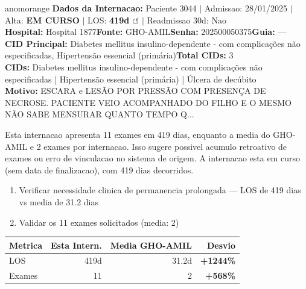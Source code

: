 \documentclass[a4paper,10pt]{article}
\begin{document}
\begin{anomalycard}[Internacao 2946 | GHO-AMIL | ALTO (z=3.63)]{anomorange}
\textbf{Dados da Internacao:} Paciente 3044 $\mid$ Admissao: 28/01/2025 $\mid$ Alta: \textcolor{anomorange}{\textbf{EM CURSO}} $\mid$ LOS: \textbf{419d \textcolor{anomorange}{$\circlearrowleft$}} $\mid$ Readmissao 30d: Nao\\
\textbf{Hospital:} Hospital 1877\quad\textbf{Fonte:} GHO-AMIL\quad\textbf{Senha:} 202500050375\quad\textbf{Guia:} ---\\
\textbf{CID Principal:} {\small Diabetes mellitus insulino-dependente - com complicações não especificadas, Hipertensão essencial (primária)}\quad\textbf{Total CIDs:} 3\\

\textbf{CIDs:} {\scriptsize Diabetes mellitus insulino-dependente - com complicações não especificadas | Hipertensão essencial (primária) | Úlcera de decúbito}\\

\textbf{Motivo:} {\scriptsize ESCARA e LESÃO POR PRESSÃO COM PRESENÇA DE NECROSE.  PACIENTE VEIO ACOMPANHADO DO FILHO E O MESMO NÃO SABE MENSURAR QUANTO TEMPO Q...}\\

\vspace{2pt}\begin{tcolorbox}[colback=severityred!20,colframe=anomorange,title={\textbf{Interpretacao de Negocio}},fonttitle=\bfseries\small,left=4pt,right=4pt,top=3pt,bottom=3pt]
{\small Esta internacao apresenta 11 exames em 419 dias, enquanto a media do GHO-AMIL e 2 exames por internacao. Isso sugere possivel acumulo retroativo de exames ou erro de vinculacao no sistema de origem. A internacao esta em curso (sem data de finalizacao), com 419 dias decorridos.}
\end{tcolorbox}
\begin{tcolorbox}[colback=severityyellow!30,colframe=anomorange,title={\textbf{Recomendacoes Especificas}},fonttitle=\bfseries\small,left=4pt,right=4pt,top=3pt,bottom=3pt]
\begin{enumerate}[nosep,leftmargin=16pt]
\item {\small Verificar necessidade clinica de permanencia prolongada --- LOS de 419 dias vs media de 31.2 dias}
\item {\small Validar os 11 exames solicitados (media: 2)}
\end{enumerate}
\end{tcolorbox}
\begin{center}\begin{tabular}{l r r r}\toprule\textbf{Metrica} & \textbf{Esta Intern.} & \textbf{Media GHO-AMIL} & \textbf{Desvio} \\\midrule
LOS & 419d & 31.2d & \textcolor{anomred}{\textbf{+1244\%}} \\
Exames & 11 & 2 & \textcolor{anomred}{\textbf{+568\%}} \\
\bottomrule\end{tabular}\end{center}


\end{anomalycard}
\end{document}
